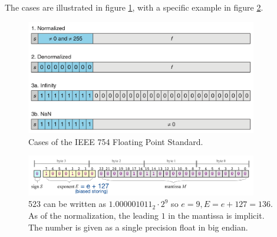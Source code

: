 
The cases are illustrated in figure \ref{fig:float_cases}, with a specific example in figure \ref{fig:523float}.

\begin{figure}[!htb]
    \centering
    \includegraphics[width=0.9\textwidth]{figures/float_cases.png}\hfill
    \caption{Cases of the IEEE 754 Floating Point Standard.}
    \label{fig:float_cases}
\end{figure}

\begin{figure}[!htb]
    \centering
    \includegraphics[width=0.9\textwidth]{figures/523float.png}\hfill
    \caption{523 can be written as $1.000001011_2 \cdot 2^9$ so $e=9, E = e + 127 = 136$. As of the normalization, the leading $1$ in the mantissa is implicit. The number is given as a single precision float in big endian.}
    \label{fig:523float}
\end{figure}

